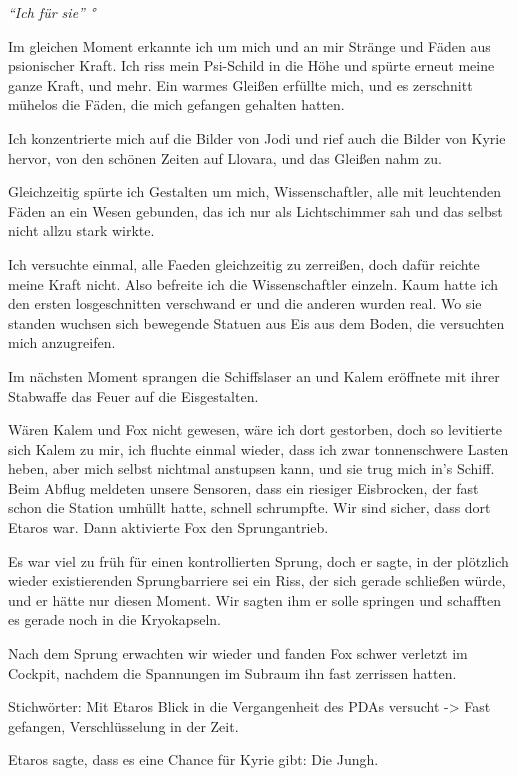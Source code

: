 \documentclass[11pt]{scrartcl}
\begin{document}
\emph{``Ich für sie'' °}

Im gleichen Moment erkannte ich um mich und an mir Stränge und Fäden aus
psionischer Kraft. Ich riss mein Psi-Schild in die Höhe und spürte
erneut meine ganze Kraft, und mehr. Ein warmes Gleißen erfüllte mich,
und es zerschnitt mühelos die Fäden, die mich gefangen gehalten hatten.

Ich konzentrierte mich auf die Bilder von Jodi und rief auch die Bilder
von Kyrie hervor, von den schönen Zeiten auf Llovara, und das Gleißen
nahm zu.

Gleichzeitig spürte ich Gestalten um mich, Wissenschaftler, alle mit
leuchtenden Fäden an ein Wesen gebunden, das ich nur als Lichtschimmer
sah und das selbst nicht allzu stark wirkte.

Ich versuchte einmal, alle Faeden gleichzeitig zu zerreißen, doch dafür
reichte meine Kraft nicht. Also befreite ich die Wissenschaftler
einzeln. Kaum hatte ich den ersten losgeschnitten verschwand er und die
anderen wurden real. Wo sie standen wuchsen sich bewegende Statuen aus
Eis aus dem Boden, die versuchten mich anzugreifen.

Im nächsten Moment sprangen die Schiffslaser an und Kalem eröffnete mit
ihrer Stabwaffe das Feuer auf die Eisgestalten.

Wären Kalem und Fox nicht gewesen, wäre ich dort gestorben, doch so
levitierte sich Kalem zu mir, ich fluchte einmal wieder, dass ich zwar
tonnenschwere Lasten heben, aber mich selbst nichtmal anstupsen kann,
und sie trug mich in's Schiff. Beim Abflug meldeten unsere Sensoren,
dass ein riesiger Eisbrocken, der fast schon die Station umhüllt hatte,
schnell schrumpfte. Wir sind sicher, dass dort Etaros war. Dann
aktivierte Fox den Sprungantrieb.

Es war viel zu früh für einen kontrollierten Sprung, doch er sagte, in
der plötzlich wieder existierenden Sprungbarriere sei ein Riss, der sich
gerade schließen würde, und er hätte nur diesen Moment. Wir sagten ihm
er solle springen und schafften es gerade noch in die Kryokapseln.

Nach dem Sprung erwachten wir wieder und fanden Fox schwer verletzt im
Cockpit, nachdem die Spannungen im Subraum ihn fast zerrissen hatten.

Stichwörter: Mit Etaros Blick in die Vergangenheit des PDAs versucht
-\textgreater{} Fast gefangen, Verschlüsselung in der Zeit.

Etaros sagte, dass es eine Chance für Kyrie gibt: Die Jungh.
\end{document}
